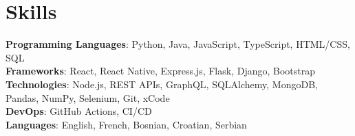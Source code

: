 \section{Skills}
    \begin{itemize}[leftmargin=0.15in, label={}]
	\small{\item{
		\textbf{Programming Languages}{: Python, Java, JavaScript, TypeScript, HTML/CSS, SQL} \\
		\textbf{Frameworks}{: React, React Native, Express.js, Flask, Django, Bootstrap} \\
		\textbf{Technologies}{: Node.js, REST APIs, GraphQL, SQLAlchemy, MongoDB, Pandas, NumPy, Selenium, Git, xCode} \\
		\textbf{DevOps}{: GitHub Actions, CI/CD} \\
		\textbf{Languages}{: English, French, Bosnian, Croatian, Serbian} \\
	}}
    \end{itemize}
